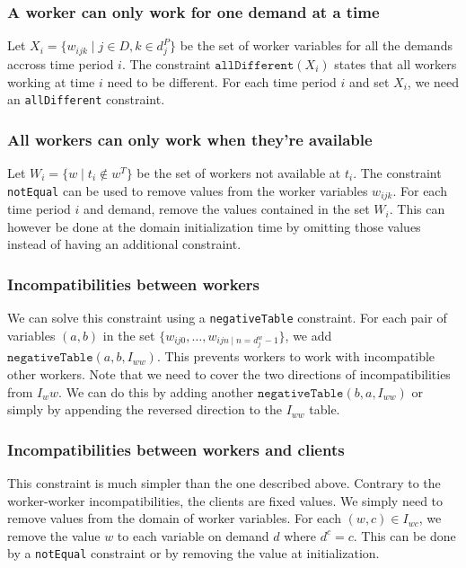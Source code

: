 \documentclass[../thesis.tex]{subfiles}
\begin{document}
\subsubsection{A worker can only work for one demand at a time}

Let $X_i = \{w_{ijk} \mid j \in D, k \in d_j^P \}$ be the set of worker variables 
for all the demands accross time period $i$. The constraint $\texttt{allDifferent}(X_i)$ states that all workers working at time $i$ need to be different.
For each time period $i$ and set $X_i$, we need an \texttt{allDifferent} constraint.

\subsubsection{All workers can only work when they’re available}

Let $W_i = \{w \mid t_i \notin w^T \}$ be the set of workers not available at $t_i$. 
The constraint \texttt{notEqual} can be used to remove values from the worker variables $w_{ijk}$.
For each time period $i$ and demand, remove the values contained in the set $W_i$.
This can however be done at the domain initialization time by omitting those values instead of having an
additional constraint.

\subsubsection{Incompatibilities between workers}

We can solve this constraint using a \texttt{negativeTable} constraint. 
For each pair of variables $(a, b)$ in the set $\{w_{ij0}, \dots, w_{ijn \mid n = d^w_j - 1}\}$, we add $\texttt{negativeTable}(a, b, I_{ww})$.
This prevents workers to work with incompatible other workers. Note that we need to cover the two directions of incompatibilities from $I_ww$. 
We can do this by adding another $\texttt{negativeTable}(b, a, I_{ww})$ or simply by appending the reversed direction to the $I_{ww}$ table.

\subsubsection{Incompatibilities between workers and clients}

This constraint is much simpler than the one described above. Contrary to the worker-worker incompatibilities,
the clients are fixed values. 
We simply need to remove values 
from the domain of worker variables. For each $(w, c) \in I_{wc}$, we remove the value $w$ to each variable on 
demand $d$ where $d^c = c$. This can be done by a \texttt{notEqual} constraint or by removing the value at initialization.
\end{document}
